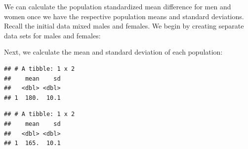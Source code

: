 \documentclass[
]{krantz}
\makeatletter
\newenvironment{Shaded}{\begin{snugshade}}{\end{snugshade}}
\newcommand{\DataTypeTok}[1]{\textcolor[rgb]{0.27,0.27,0.27}{#1}}
\newcommand{\KeywordTok}[1]{\textcolor[rgb]{0.27,0.27,0.27}{\textbf{#1}}}
\newcommand{\NormalTok}[1]{#1}
\newcommand{\OperatorTok}[1]{\textcolor[rgb]{0.43,0.43,0.43}{\textbf{#1}}}
\newcommand{\StringTok}[1]{\textcolor[rgb]{0.5,0.5,0.5}{#1}}
\newenvironment{kframe}{%
\medskip{}
\setlength{\fboxsep}{.8em}
 \def\at@end@of@kframe{}%
 \ifinner\ifhmode%
  \def\at@end@of@kframe{\end{minipage}}%
  \begin{minipage}{\columnwidth}%
 \fi\fi%
 \def\FrameCommand##1{\hskip\@totalleftmargin \hskip-\fboxsep
 \colorbox{shadecolor}{##1}\hskip-\fboxsep
     \hskip-\linewidth \hskip-\@totalleftmargin \hskip\columnwidth}%
 \MakeFramed {\advance\hsize-\width
   \@totalleftmargin\z@ \linewidth\hsize
   \@setminipage}}%
 {\par\unskip\endMakeFramed%
 \at@end@of@kframe}
\renewenvironment{Shaded}{\begin{kframe}}{\end{kframe}}
\makeatother
\begin{document}
We can calculate the population standardized mean difference for men and women once we have the respective population means and standard deviations. Recall the initial data mixed males and females. We begin by creating separate data sets for males and females:

\begin{Shaded}
\end{Shaded}

Next, we calculate the mean and standard deviation of each population:

\begin{Shaded}
\end{Shaded}

\begin{verbatim}
## # A tibble: 1 x 2
##    mean    sd
##   <dbl> <dbl>
## 1  180.  10.1
\end{verbatim}

\begin{Shaded}
\end{Shaded}

\begin{verbatim}
## # A tibble: 1 x 2
##    mean    sd
##   <dbl> <dbl>
## 1  165.  10.1
\end{verbatim}
\end{document}
